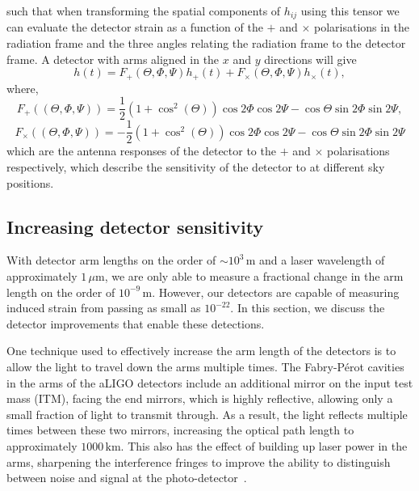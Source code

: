 %
such that when transforming the spatial components of $h_{ij}$ using this tensor we can evaluate the detector strain as a function of the $+$ and $\times$ polarisations in the radiation frame and the three angles relating the radiation frame to the detector frame. A detector with arms aligned in the $x$ and $y$ directions will give
%
\begin{equation}
    h(t) = F_{+}(\Theta, \Phi, \Psi)h_{+}(t) + F_{\times}(\Theta, \Phi, \Psi)h_{\times}(t) ,
    \label{1:eq:h_t_linear_combination}
\end{equation}
%
where,
%
\begin{equation}
    F_{+}((\Theta, \Phi, \Psi)) = \frac{1}{2}(1 + \cos^{2}(\Theta))\cos2\Phi\cos2\Psi - \cos\Theta\sin2\Phi\sin2\Psi,
\end{equation}
%
\begin{equation}
    F_{\times}((\Theta, \Phi, \Psi)) = -\frac{1}{2}(1 + \cos^{2}(\Theta))\cos2\Phi\cos2\Psi - \cos\Theta\sin2\Phi\sin2\Psi
\end{equation}
%
which are the antenna responses of the detector to the $+$ and $\times$ polarisations respectively, which describe the sensitivity of the detector to \gws at different sky positions. 


\subsection{\label{1:sec:increase-det-sens}Increasing detector sensitivity}

With detector arm lengths on the order of ${\sim}10^{3} \, \text{m}$ and a laser wavelength of approximately $1 \, \mu\text{m}$, we are only able to measure a fractional change in the arm length on the order of $10^{-9} \, \text{m}$. However, our detectors are capable of measuring induced strain from passing \gws as small as $10^{-22}$. In this section, we discuss the detector improvements that enable these detections.

One technique used to effectively increase the arm length of the detectors is to allow the light to travel down the arms multiple times. The Fabry-Pérot cavities~\cite{aLIGO:2015} in the arms of the aLIGO detectors include an additional mirror on the input test mass (ITM), facing the end mirrors, which is highly reflective, allowing only a small fraction of light to transmit through. As a result, the light reflects multiple times between these two mirrors, increasing the optical path length to approximately $1000 \, \text{km}$. This also has the effect of building up laser power in the arms, sharpening the interference fringes to improve the ability to distinguish between noise and signal at the photo-detector~\cite{Meers:1988}.

